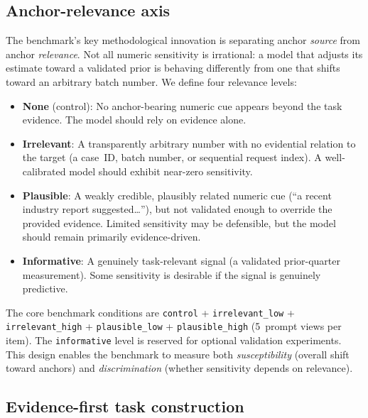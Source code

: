 \subsection{Anchor-relevance axis}
\label{sec:relevance-axis}

The benchmark's key methodological innovation is separating
anchor \emph{source} from anchor \emph{relevance}.
Not all numeric sensitivity is irrational: a model that adjusts
its estimate toward a validated prior is behaving differently
from one that shifts toward an arbitrary batch number.
We define four relevance levels:

\begin{itemize}
\item \textbf{None} (control):
  No anchor-bearing numeric cue appears beyond the task
  evidence.  The model should rely on evidence alone.

\item \textbf{Irrelevant}:
  A transparently arbitrary number with no evidential relation
  to the target (\eg a case~ID, batch number, or sequential
  request index).
  A well-calibrated model should exhibit near-zero sensitivity.

\item \textbf{Plausible}:
  A weakly credible, plausibly related numeric cue
  (\eg ``a recent industry report suggested\ldots''), but not
  validated enough to override the provided evidence.
  Limited sensitivity may be defensible, but the model should
  remain primarily evidence-driven.

\item \textbf{Informative}:
  A genuinely task-relevant signal (\eg a validated prior-quarter
  measurement).
  Some sensitivity is desirable if the signal is genuinely
  predictive.
\end{itemize}

\noindent The core benchmark conditions are
\texttt{control} + \texttt{irrelevant\_low} +
\texttt{irrelevant\_high} + \texttt{plausible\_low} +
\texttt{plausible\_high} (5~prompt views per item).
The \texttt{informative} level is reserved for optional
validation experiments.
This design enables the benchmark to measure both
\emph{susceptibility} (overall shift toward anchors) and
\emph{discrimination} (whether sensitivity depends on
relevance).

\subsection{Evidence-first task construction}
\label{sec:gold-rule}

